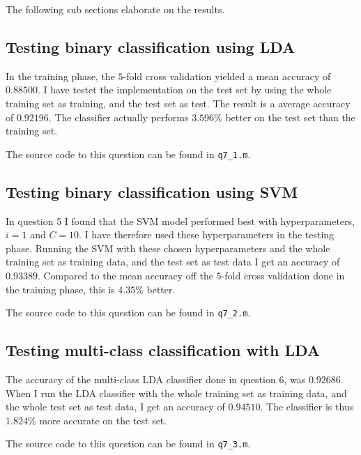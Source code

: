 \documentclass[10pt]{article}
\begin{document}
The following sub sections elaborate on the results.

\subsection*{Testing binary classification using LDA} %
\label{sub:binary_classification}
In the training phase, the $5$-fold cross validation yielded a mean accuracy of $0.88500$. I have testet the implementation on the test set by using the whole training set as training, and the test set as test. The result is a average accuracy of $0.92196$. The classifier actually performs $3.596\%$ better on the test set than the training set. 

The source code to this question can be found in \texttt{q7\_1.m}.


\subsection*{Testing binary classification using SVM} %
\label{ssub:testing_binary_classification_using_svm}
In question 5 I found that the SVM model performed best with hyperparameters, $i=1$ and $C=10$. I have therefore used these hyperparameters in the testing phase. Running the SVM with these chosen hyperparameters and the whole training set as training data, and the test set as test data I get an accuracy of $0.93389$. Compared to the mean accuracy off the $5$-fold cross validation done in the training phase, this is $4.35\%$ better.

The source code to this question can be found in \texttt{q7\_2.m}.

\subsection*{Testing multi-class classification with LDA} %
\label{sub:multi_class_classification}

The accuracy of the multi-class LDA classifier done in question 6, was $0.92686$. When I run the LDA classifier with the whole training set as training data, and the whole test set as test data, I get an accuracy of $0.94510$. The classifier is thus $1.824\%$ more accurate on the test set.

The source code to this question can be found in \texttt{q7\_3.m}.
\end{document}

